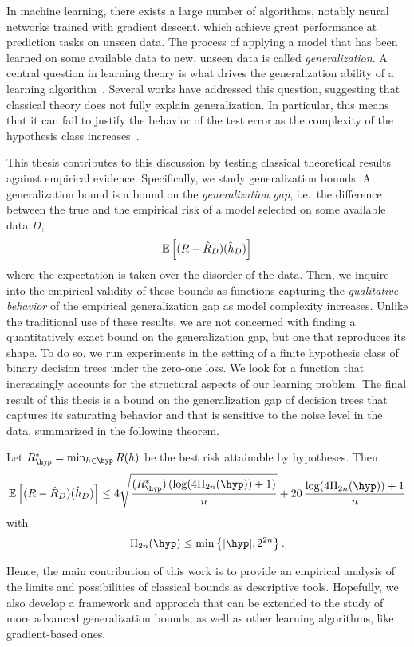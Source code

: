 In machine learning, there exists a large number of algorithms, notably neural networks trained with gradient descent, which achieve great performance at prediction tasks on unseen data. 
The process of applying a model that has been learned on some available data to new, unseen data is called {\it generalization\/}.
A central question in learning theory is what drives the generalization ability of a learning algorithm~\cite{zhang2016understanding,neyshabur2014search}. Several works have addressed this question, suggesting that classical theory does not fully explain generalization. In particular, this means that it can fail to justify the behavior of the test error as the complexity of the hypothesis class increases~\cite{belkin2019reconciling,zhang2016understanding,zhang2021understanding,nagarajan2019uniform}.

This thesis contributes to this discussion by testing classical theoretical results against empirical evidence. Specifically, we study generalization bounds. A generalization bound is a bound on the {\it generalization gap}, i.e.\ the difference between the true and the empirical risk of a model selected on some available data $D$, 
\begin{equation}\label{eq: target}
\mathbb{E}\left[(R-\hat R_D)(\hat h_D)\right]
\end{equation}
where the expectation is taken over the disorder of the data. Then, we inquire into the empirical validity of these bounds as functions capturing the {\it qualitative behavior\/} of the empirical generalization gap as model complexity increases. Unlike the traditional use of these results, we are not concerned with finding a quantitatively exact bound on the generalization gap, but one that reproduces its shape. To do so, we run experiments in the setting of a finite hypothesis class of binary decision trees under the zero-one loss. We look for a function that increasingly accounts for the structural aspects of our learning problem. The final result of this thesis is a bound on the generalization gap of decision trees that captures its saturating behavior and that is sensitive to the noise level in the data, summarized in the following theorem. 

\begin{theorem}
Let $R^*_\hyp = \min_{h\in\hyp} R(h)$ be the best risk attainable by hypotheses. Then
\[
\expv\left[(R-\hat R_D)(\hat h_D)\right] \le 4\sqrt{\frac{(R^*_\hyp)\left(\log (4\Pi_{2n}(\hyp))+1\right)}{n}} + 20\,\frac{\log(4\Pi_{2n}(\hyp))+1}{n}
\]
with
\[
\Pi_{2n}(\hyp) \le \min\left\{\vert\hyp\vert, 2^{2n}\right\}.
\]
\end{theorem}

Hence, the main contribution of this work is to provide an empirical analysis of the limits and possibilities of classical bounds as descriptive tools. Hopefully, we also develop a framework and approach that can be extended to the study of more advanced generalization bounds, as well as other learning algorithms, like gradient-based ones.